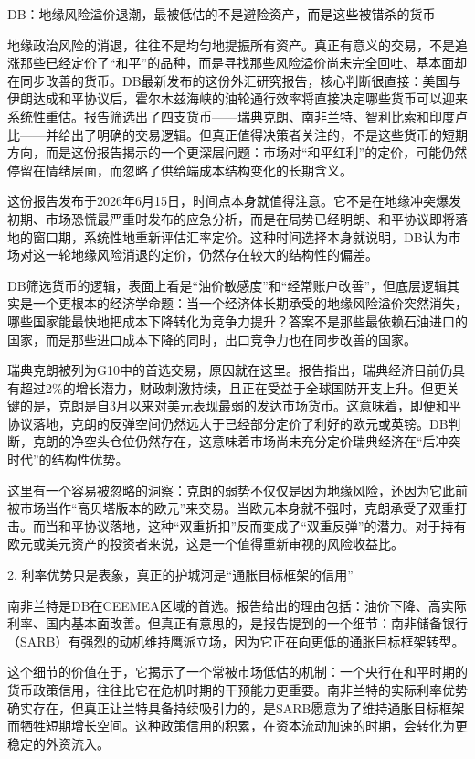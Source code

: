 \documentclass[11pt]{ctexart}
\begin{document}
DB：地缘风险溢价退潮，最被低估的不是避险资产，而是这些被错杀的货币

地缘政治风险的消退，往往不是均匀地提振所有资产。真正有意义的交易，不是追涨那些已经定价了“和平”的品种，而是寻找那些风险溢价尚未完全回吐、基本面却在同步改善的货币。DB最新发布的这份外汇研究报告，核心判断很直接：美国与伊朗达成和平协议后，霍尔木兹海峡的油轮通行效率将直接决定哪些货币可以迎来系统性重估。报告筛选出了四支货币——瑞典克朗、南非兰特、智利比索和印度卢比——并给出了明确的交易逻辑。但真正值得决策者关注的，不是这些货币的短期方向，而是这份报告揭示的一个更深层问题：市场对“和平红利”的定价，可能仍然停留在情绪层面，而忽略了供给端成本结构变化的长期含义。

这份报告发布于2026年6月15日，时间点本身就值得注意。它不是在地缘冲突爆发初期、市场恐慌最严重时发布的应急分析，而是在局势已经明朗、和平协议即将落地的窗口期，系统性地重新评估汇率定价。这种时间选择本身就说明，DB认为市场对这一轮地缘风险消退的定价，仍然存在较大的结构性的偏差。

DB筛选货币的逻辑，表面上看是“油价敏感度”和“经常账户改善”，但底层逻辑其实是一个更根本的经济学命题：当一个经济体长期承受的地缘风险溢价突然消失，哪些国家能最快地把成本下降转化为竞争力提升？答案不是那些最依赖石油进口的国家，而是那些进口成本下降的同时，出口竞争力也在同步改善的国家。

瑞典克朗被列为G10中的首选交易，原因就在这里。报告指出，瑞典经济目前仍具有超过2\%的增长潜力，财政刺激持续，且正在受益于全球国防开支上升。但更关键的是，克朗是自3月以来对美元表现最弱的发达市场货币。这意味着，即便和平协议落地，克朗的反弹空间仍然远大于已经部分定价了利好的欧元或英镑。DB判断，克朗的净空头仓位仍然存在，这意味着市场尚未充分定价瑞典经济在“后冲突时代”的结构性优势。

这里有一个容易被忽略的洞察：克朗的弱势不仅仅是因为地缘风险，还因为它此前被市场当作“高贝塔版本的欧元”来交易。当欧元本身就不强时，克朗承受了双重打击。而当和平协议落地，这种“双重折扣”反而变成了“双重反弹”的潜力。对于持有欧元或美元资产的投资者来说，这是一个值得重新审视的风险收益比。

2. 利率优势只是表象，真正的护城河是“通胀目标框架的信用”

南非兰特是DB在CEEMEA区域的首选。报告给出的理由包括：油价下降、高实际利率、国内基本面改善。但真正有意思的，是报告提到的一个细节：南非储备银行（SARB）有强烈的动机维持鹰派立场，因为它正在向更低的通胀目标框架转型。

这个细节的价值在于，它揭示了一个常被市场低估的机制：一个央行在和平时期的货币政策信用，往往比它在危机时期的干预能力更重要。南非兰特的实际利率优势确实存在，但真正让兰特具备持续吸引力的，是SARB愿意为了维持通胀目标框架而牺牲短期增长空间。这种政策信用的积累，在资本流动加速的时期，会转化为更稳定的外资流入。
\end{document}
